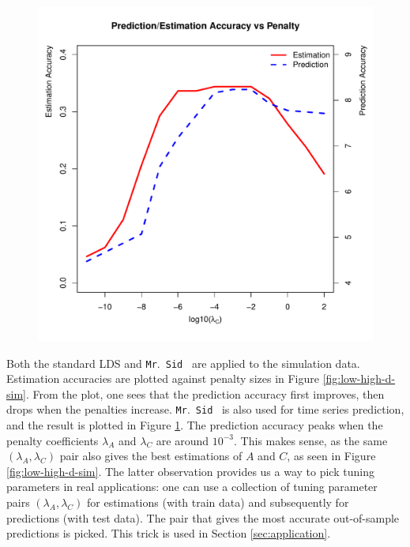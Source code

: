 \documentclass[times,twocolumn,final,authoryear]{elsarticle}
\newcommand{\mrsid}{{\sc \texttt{Mr}.~\texttt{Sid}}}
\let\oldref\ref
\renewcommand{\ref}[1]{(\oldref{#1})}
\begin{document}
\begin{figure}
\centering
\includegraphics[scale=0.46]{est-pred-accuracy.pdf}

\label{fig:estpredaccuracy}
\end{figure}

Both the standard LDS and \mrsid~  are applied to the simulation data. Estimation accuracies are plotted against penalty sizes in Figure \oldref{fig:low-high-d-sim}. From the plot, one sees that the prediction accuracy first improves, then drops when the penalties increase. \mrsid~  is also used for time series prediction, and the result is plotted in Figure \oldref{fig:estpredaccuracy}. The prediction accuracy peaks when the penalty coefficients $\lambda_A$ and $\lambda_C$ are around $10^{-3}$. This makes sense, as the same $(\lambda_A,\lambda_C)$ pair also gives the best estimations of $A$ and $C$, as seen in Figure \oldref{fig:low-high-d-sim}. The latter observation provides us a way to pick tuning parameters in real applications: one can use a collection of tuning parameter pairs $(\lambda_A,\lambda_C)$ for estimations (with train data) and subsequently for predictions (with test data). The pair that gives the most accurate out-of-sample predictions is picked. This trick is used in Section \oldref{sec:application}.
\end{document}
